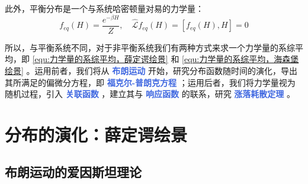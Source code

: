 此外，平衡分布是一个与系统哈密顿量对易的力学量：
\begin{equation}\label{equ:平衡分布和哈密顿量对易}
    f_{eq}(H) = \frac{e^{-\beta H}}{Z} ,\quad\mathcal{\hat L}f_{eq}(H) = [f_{eq}(H), H] = 0
\end{equation}

所以，与平衡系统不同，对于非平衡系统我们有两种方式来求一个力学量的系综平均，即 \eqref{equ:力学量的系综平均，薛定谔绘景} 和 \eqref{equ:力学量的系综平均，海森堡绘景} 。运用前者，我们将从 \textcolor{RoyalBlue}{\textbf{\kaishu 布朗运动}} 开始，研究分布函数随时间的演化，导出其所满足的偏微分方程，即 \textcolor{RoyalBlue}{\textbf{\kaishu 福克尔-普朗克方程}} ；运用后者，我们将力学量视为随机过程，引入 \textcolor{RoyalBlue}{\textbf{\kaishu 关联函数}} ，建立其与 \textcolor{RoyalBlue}{\textbf{\kaishu 响应函数}} 的联系，研究 \textcolor{RoyalBlue}{\textbf{\kaishu 涨落耗散定理}} 。

\section{分布的演化：薛定谔绘景}\label{sec:分布的演化：薛定谔绘景}

\subsection{布朗运动的爱因斯坦理论}\label{subsec:布朗运动的爱因斯坦理论}

